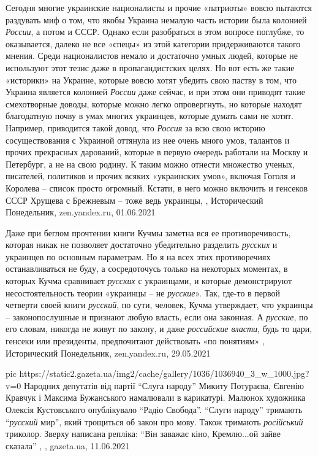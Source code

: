 Сегодня многие украинские националисты и прочие «патриоты» вовсю пытаются
раздувать миф о том, что якобы Украина немалую часть истории была колонией
\emph{России}, а потом и СССР. Однако если разобраться в этом вопросе поглубже, то
оказывается, далеко не все «спецы» из этой категории придерживаются такого
мнения. Среди националистов немало и достаточно умных людей, которые не
используют этот тезис даже в пропагандистских целях.  Но вот есть же такие
«историки» на Украине, которые вовсю хотят убедить свою паству в том, что
Украина является колонией \emph{России} даже сейчас, и при этом они приводят такие
смехотворные доводы, которые можно легко опровергнуть, но которые находят
благодатную почву в умах многих украинцев, которые думать сами не хотят.
Например, приводится такой довод, что \emph{Россия} за всю свою историю
сосуществования с Украиной оттянула из нее очень много умов, талантов и прочих
прекрасных дарований, которые в первую очередь работали на Москву и Петербург,
а не на свою родину. К таким можно отнести множество ученых, писателей,
политиков и прочих всяких «украинских умов», включая Гоголя и Королева – список
просто огромный. Кстати, в него можно включить и генсеков СССР Хрущева с
Брежневым – тоже ведь украинцы,
, 
Исторический Понедельник, zen.yandex.ru, 01.06.2021

Даже при беглом прочтении книги Кучмы заметна вся ее противоречивость, которая
никак не позволяет достаточно убедительно разделить \emph{русских} и украинцев по
основным параметрам. Но я на всех этих противоречиях останавливаться не буду, а
сосредоточусь только на некоторых моментах, в которых Кучма сравнивает \emph{русских}
с украинцами, и которые демонстрируют несостоятельность теории «украинцы – не
\emph{русские}».  Так, где-то в первой четверти своей книги \emph{русский}, по сути, человек,
Кучма утверждает, что украинцы – законопослушные и признают любую власть, если
она законная. А \emph{русские}, по его словам, никогда не живут по закону, и даже
\emph{российские власти}, будь то цари, генсеки или президенты, предпочитают
действовать «по понятиям»
, Исторический Понедельник, zen.yandex.ru, 29.05.2021

\ifcmt
  pic https://static2.gazeta.ua/img2/cache/gallery/1036/1036940_3_w_1000.jpg?v=0
\fi
Народних депутатів від партії \enquote{Слуга народу} Микиту Потураєва, Євгенію Кравчук
і Максима Бужанського намалювали в карикатурі. Малюнок художника Олексія
Кустовського опублікувало \enquote{Радіо Свобода}. \enquote{Слуги народу} тримають \enquote{\emph{русский}
мир}, який трощиться об закон про мову. Також тримають \emph{російський} триколор.
Зверху написана репліка: \enquote{Він заважає кіно, Кремлю...ой зайве сказала}
, , gazeta.ua, 11.06.2021

